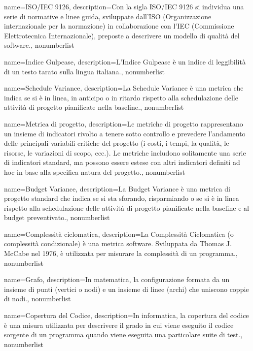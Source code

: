 {
	name={ISO/IEC 9126},
	description={Con la sigla ISO/IEC 9126 si individua una serie di normative e linee guida, sviluppate dall'ISO (Organizzazione internazionale per la normazione) in collaborazione con l'IEC (Commissione Elettrotecnica Internazionale), preposte a descrivere un modello di qualità del software.}, 
	nonumberlist 
}

{
	name={Indice Gulpease},
	description={L'Indice Gulpease è un indice di leggibilità di un testo tarato sulla lingua italiana.}, 
	nonumberlist 
}

{
	name={Schedule Variance},
	description={La Schedule Variance è una metrica che indica se si è in linea, in anticipo o in ritardo rispetto alla schedulazione delle attività di progetto pianificate nella baseline.}, 
	nonumberlist 
}

{
	name={Metrica di progetto},
	description={Le metriche di progetto rappresentano un insieme di indicatori rivolto a tenere sotto controllo e prevedere l'andamento delle principali variabili critiche del progetto (i costi, i tempi, la qualità, le risorse, le variazioni di scopo, ecc.). Le metriche includono solitamente una serie di indicatori standard, ma possono essere estese con altri indicatori definiti ad hoc in base alla specifica natura del progetto.}, 
	nonumberlist 
}


{
	name={Budget Variance},
	description={La Budget Variance è una metrica di progetto standard che indica se si sta sforando, risparmiando o se si è in linea rispetto alla schedulazione delle attività di progetto pianificate nella baseline e al budget preventivato.}, 
	nonumberlist 
}

{
	name={Complessità ciclomatica},
	description={La Complessità Ciclomatica (o complessità condizionale) è una metrica software. Sviluppata da Thomas J. McCabe nel 1976, è utilizzata per misurare la complessità di un programma.}, 
	nonumberlist 
}

{
	name={Grafo},
	description={In matematica, la configurazione formata da un insieme di punti (vertici o nodi) e un insieme di linee (archi) che uniscono coppie di nodi.}, 
	nonumberlist 
}

{
	name={Copertura del Codice},
	description={In informatica, la copertura del codice è una misura utilizzata per descrivere il grado in cui viene eseguito il codice sorgente di un programma quando viene eseguita una particolare suite di test.}, 
	nonumberlist 
}

